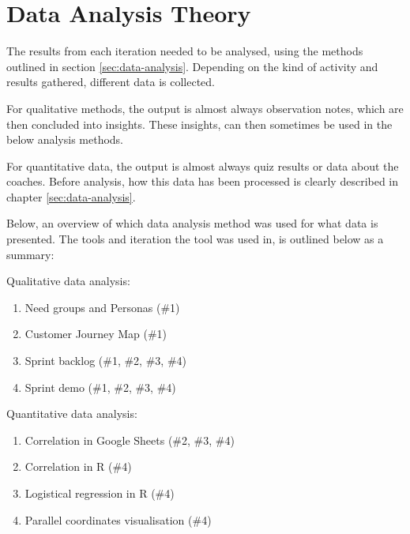 \section{Data Analysis Theory}




The results from each iteration needed to be analysed, using the methods outlined in section \ref{sec:data-analysis}. Depending on the kind of activity and results gathered, different data is collected.

For qualitative methods, the output is almost always observation notes, which are then concluded into insights. These insights, can then sometimes be used in the below analysis methods.

For quantitative data, the output is almost always quiz results or data about the coaches. Before analysis, how this data has been processed is clearly described in chapter \ref{sec:data-analysis}.

Below, an overview of which data analysis method was used for what data is presented. The tools and iteration the tool was used in, is outlined below as a summary:

Qualitative data analysis:
\begin{enumerate}
\item Need groups and Personas (\#1)
\item Customer Journey Map (\#1)
\item Sprint backlog (\#1, \#2, \#3, \#4)
\item Sprint demo (\#1, \#2, \#3, \#4)
\end{enumerate}

Quantitative data analysis:
\begin{enumerate}
\item Correlation in Google Sheets (\#2, \#3, \#4)
\item Correlation in R (\#4)
\item Logistical regression in R (\#4)
\item Parallel coordinates visualisation (\#4)
\end{enumerate}


